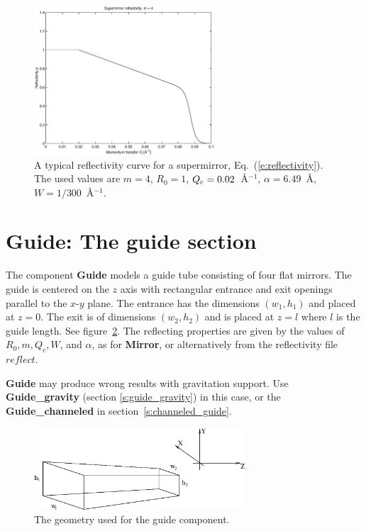 \begin{figure}
  \begin{center}
    \includegraphics[width=0.6\textwidth]{figures/supermirror.eps}
  \end{center}
\caption{A typical reflectivity curve for a supermirror,
Eq.~(\protect\ref{e:reflectivity}). The used values are
$ m=4$, $R_0=1$, $Q_{\rm c} = 0.02$~\AA$^{-1}$, $\alpha = 6.49$~\AA,
$ W=1/300$~\AA$^{-1}$.
}
\label{f:reflectivity}
\end{figure}

\newpage

\section{Guide: The guide section}


The component {\bf Guide}
models a guide tube consisting of four flat mirrors. The
guide is centered on the $z$ axis with rectangular entrance and exit
openings parallel to the $x$-$y$ plane. The entrance has the dimensions
$(w_1,h_1)$ and placed at $z=0$. The exit is of dimensions $(w_2,h_2)$
and is placed at $z=l$ where $l$ is the guide length. See
figure~\ref{f:guide}.
The reflecting properties are given by the values of
$R_0, m, Q_c, W$, and $\alpha$, as for {\bf Mirror}, or alternatively from the reflectivity file $reflect$.

{\bf Guide} may produce wrong results with gravitation support.
Use {\bf Guide\_gravity} (section \ref{s:guide_gravity}) in this case,
or the {\bf Guide\_channeled}
in section~\ref{s:channeled_guide}.

\begin{figure}
  \begin{center}
    \includegraphics[width=0.7\textwidth]{figures/guide1.eps}
  \end{center}
\caption{The geometry used for the guide component.}
\label{f:guide}
\end{figure}

